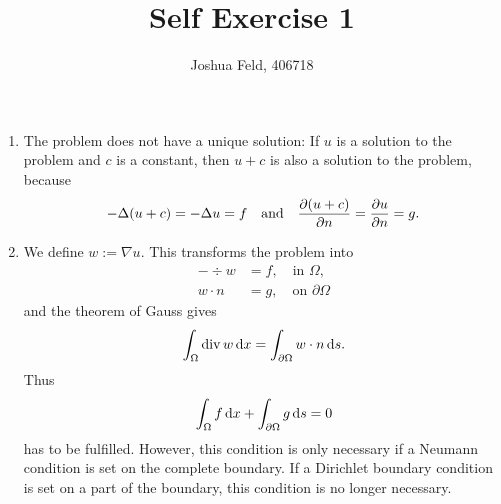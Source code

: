 \documentclass[english]{exercise}
\title{Self Exercise 1}
\author{Joshua Feld, 406718}
\begin{document}
	\maketitle


	\section{}

	\begin{enumerate}
		\item The problem does not have a unique solution:
		If \(u\) is a solution to the problem and \(c\) is a constant, then \(u + c\) is also a solution to the problem, because
		\[
			-\Delta\parentheses*{u + c} = -\Delta u = f \quad \text{and} \quad \frac{\partial\parentheses*{u + c}}{\partial n} = \frac{\partial u}{\partial n} = g.
		\]
		\item We define \(w := \nabla u\).
		This transforms the problem into
		\begin{align*}
			-\div w &= f, \quad \text{in }\Omega,\\
			w \cdot n &= g, \quad \text{on }\partial\Omega
		\end{align*}
		and the theorem of Gauss gives
		\[
			\int_\Omega \operatorname{div} w\mathop{\mathrm{d}\!} x = \int_{\partial\Omega}w \cdot n\mathop{\mathrm{d}\!} s.
		\]
		Thus
		\[
			\int_\Omega f\mathop{\mathrm{d}\!} x + \int_{\partial\Omega}g\mathop{\mathrm{d}\!} s = 0
		\]
		has to be fulfilled.
		However, this condition is only necessary if a Neumann condition is set on the complete boundary.
		If a Dirichlet boundary condition is set on a part of the boundary, this condition is no longer necessary.
	\end{enumerate}


	\section{}
\end{document}
